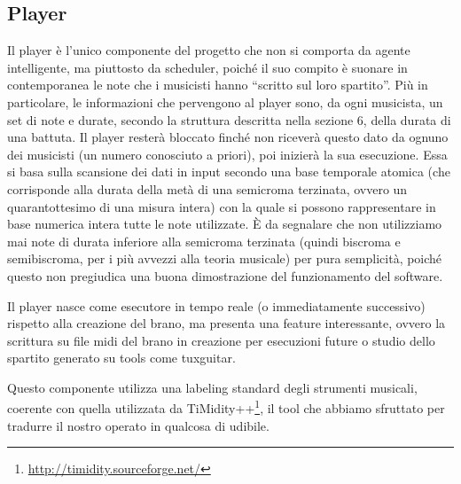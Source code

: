 \subsection{Player}
Il player è l'unico componente del progetto che non si comporta da agente 
intelligente, ma piuttosto da scheduler, poiché il suo compito è suonare in 
contemporanea le note che i musicisti hanno ``scritto sul loro spartito''.
Più in particolare, le informazioni che pervengono al player sono, da ogni 
musicista, un set di note e durate, secondo la struttura descritta nella 
sezione 6, della durata di una battuta. %
Il player resterà bloccato finché non riceverà questo dato da ognuno dei 
musicisti (un numero conosciuto a priori), poi inizierà la sua esecuzione.
Essa si basa sulla scansione dei dati in input secondo una base temporale 
atomica (che corrisponde alla durata della metà di una semicroma terzinata, 
ovvero un quarantottesimo di una misura intera) con la quale si possono 
rappresentare in base numerica intera tutte le note utilizzate.
È da segnalare che non utilizziamo mai note di durata inferiore alla semicroma 
terzinata (quindi biscroma e semibiscroma, per i più avvezzi alla teoria musicale) 
per pura semplicità, poiché questo non pregiudica una buona dimostrazione del 
funzionamento del software.
\newline

Il player nasce come esecutore in tempo reale (o immediatamente successivo) 
rispetto alla creazione del brano, ma presenta una feature interessante, 
ovvero la scrittura su file midi del brano in creazione per esecuzioni future 
o studio dello spartito generato su tools come tuxguitar.

Questo componente utilizza una labeling standard degli strumenti musicali, 
coerente con quella utilizzata da 
TiMidity++\footnote{\url{http://timidity.sourceforge.net/}}, 
il tool che abbiamo sfruttato per tradurre il nostro operato in qualcosa di udibile.
